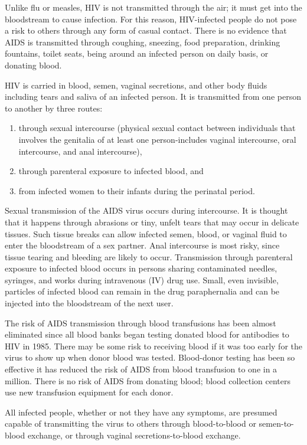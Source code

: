 Unlike flu or measles, HIV is not transmitted through the air; it must get into the bloodstream
to cause infection. For this reason, HIV-infected people do not pose a risk to others through
any form of casual contact. There is no evidence that AIDS is transmitted through coughing,
sneezing, food preparation, drinking fountains, toilet seats, being around an infected person
on daily basis, or donating blood.

HIV is carried in blood, semen, vaginal secretions, and other body fluids including tears and
saliva of an infected person. It is transmitted from one person to another by three routes: 
\begin{enumerate}
\item through sexual intercourse (physical sexual contact between individuals that involves the
genitalia of at least one person-includes vaginal intercourse, oral intercourse, and anal
intercourse),
\item through parenteral exposure to infected blood, and
\item from infected women to
their infants during the perinatal period.
\end{enumerate}

Sexual transmission of the AIDS virus occurs during intercourse. It is thought that it happens
through abrasions or tiny, unfelt tears that may occur in delicate tissues. Such tissue breaks
can allow infected semen, blood, or vaginal fluid to enter the bloodstream of a sex partner.
Anal intercourse is most risky, since tissue tearing and bleeding are likely to occur.
Transmission through parenteral exposure to infected blood occurs in persons sharing
contaminated needles, syringes, and works during intravenous (IV) drug use. Small, even
invisible, particles of infected blood can remain in the drug paraphernalia and can be injected
into the bloodstream of the next user.

The risk of AIDS transmission through blood transfusions has been almost eliminated since
all blood banks began testing donated blood for antibodies to HIV in 1985. There may be
some risk to receiving blood if it was too early for the virus to show up when donor blood was
tested. Blood-donor testing has been so effective it has reduced the risk of AIDS from blood
transfusion to one in a million. There is no risk of AIDS from donating blood; blood collection
centers use new transfusion equipment for each donor.

All infected people, whether or not they have any symptoms, are presumed capable of
transmitting the virus to others through blood-to-blood or semen-to-blood exchange, or
through vaginal secretions-to-blood exchange.

